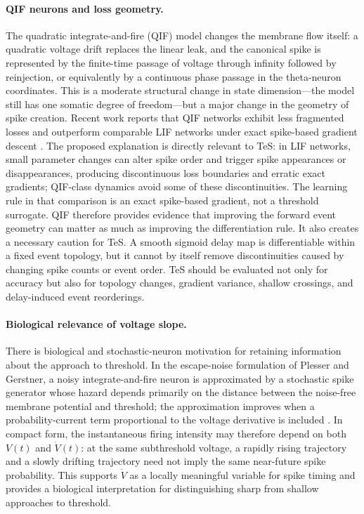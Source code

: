 \paragraph{QIF neurons and loss geometry.}
The quadratic integrate-and-fire (QIF) model changes the membrane flow itself: a quadratic voltage drift replaces the linear leak, and the canonical spike is represented by the finite-time passage of voltage through infinity followed by reinjection, or equivalently by a continuous phase passage in the theta-neuron coordinates. This is a moderate structural change in state dimension---the model still has one somatic degree of freedom---but a major change in the geometry of spike creation. Recent work reports that QIF networks exhibit less fragmented losses and outperform comparable LIF networks under exact spike-based gradient descent \cite{wenig2026qif}. The proposed explanation is directly relevant to TeS: in LIF networks, small parameter changes can alter spike order and trigger spike appearances or disappearances, producing discontinuous loss boundaries and erratic exact gradients; QIF-class dynamics avoid some of these discontinuities. The learning rule in that comparison is an exact spike-based gradient, not a threshold surrogate. QIF therefore provides evidence that improving the forward event geometry can matter as much as improving the differentiation rule. It also creates a necessary caution for TeS. A smooth sigmoid delay map is differentiable within a fixed event topology, but it cannot by itself remove discontinuities caused by changing spike counts or event order. TeS should be evaluated not only for accuracy but also for topology changes, gradient variance, shallow crossings, and delay-induced event reorderings.

\paragraph{Biological relevance of voltage slope.}
There is biological and stochastic-neuron motivation for retaining information about the approach to threshold. In the escape-noise formulation of Plesser and Gerstner, a noisy integrate-and-fire neuron is approximated by a stochastic spike generator whose hazard depends primarily on the distance between the noise-free membrane potential and threshold; the approximation improves when a probability-current term proportional to the voltage derivative is included \cite{plesser2000noise}. In compact form, the instantaneous firing intensity may therefore depend on both $V(t)$ and $\dot V(t)$: at the same subthreshold voltage, a rapidly rising trajectory and a slowly drifting trajectory need not imply the same near-future spike probability. This supports $\dot V$ as a locally meaningful variable for spike timing and provides a biological interpretation for distinguishing sharp from shallow approaches to threshold.

